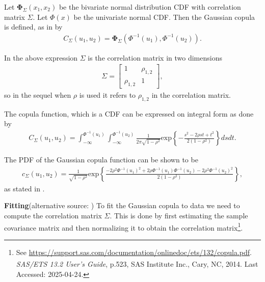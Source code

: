Let $\boldsymbol{\Phi}_\Sigma(x_1,x_2)$ be the bivariate normal distribution \gls{CDF} with correlation matrix $\Sigma$. Let $\Phi(x)$ be the univariate normal \gls{CDF}. Then the Gaussian copula is defined, as in \citet[p.~112]{Umberto2004copulaMethods}  by 
\begin{align*}
    C_\Sigma(u_1,u_2) = \boldsymbol{\Phi}_\Sigma(\Phi^{-1}(u_1),\Phi^{-1}(u_2)).
\end{align*}

In the above expression $\Sigma$ is the correlation matrix in two dimensions 
\begin{align*}
    \Sigma = 
    \begin{bmatrix}
            1 & \rho_{1,2} \\
            \rho_{1,2} & 1
    \end{bmatrix},
\end{align*}
so in the sequel when $\rho$ is used it refers to $\rho_{1,2}$ in the correlation matrix.

The copula function, which is a \gls{CDF} can be expressed on integral form as done by \citet[p.~112]{Umberto2004copulaMethods}
\begin{align*}
     C_{\Sigma} (u_1,u_2)
    = \int_{-\infty}^{\Phi^{-1}(u_1)}\int_{-\infty}^{\Phi^{-1}(u_2)}
    \frac{1}{2\pi\sqrt{1-\rho^2}} \mathrm{exp}\left\{ - \frac{s^2-2\rho st+t^2}{2(1-\rho^2)}   \right\} dsdt.
\end{align*} 

The \gls{PDF} of the Gaussian copula function can be shown to be 
\begin{align*}
     c_{\Sigma} (u_1,u_2)
    = \frac{1}{\sqrt{1-\rho^2}} \mathrm{exp}\left\{  \frac{-2\rho^2\Phi^{-1}(u_1)^2  +2\rho \Phi^{-1}(u_1)\Phi^{-1}(u_2) -2\rho^2\Phi^{-1}(u_2)^2}{2(1-\rho^2)}   \right\},
\end{align*}
as stated in \citet[p.267]{Alexander2008}.



\textbf{Fitting}(alternative source: )
To fit the Gaussian copula to data we need to compute the correlation matrix $\Sigma$. This is done by first estimating the sample covariance matrix and then normalizing it to obtain the correlation matrix\footnote{See \url{https://support.sas.com/documentation/onlinedoc/ets/132/copula.pdf}. \textit{SAS/ETS\textsuperscript{\textregistered} 13.2 User's Guide}, p.523, SAS Institute Inc., Cary, NC, 2014. Last Accessed: 2025-04-24.}.%

